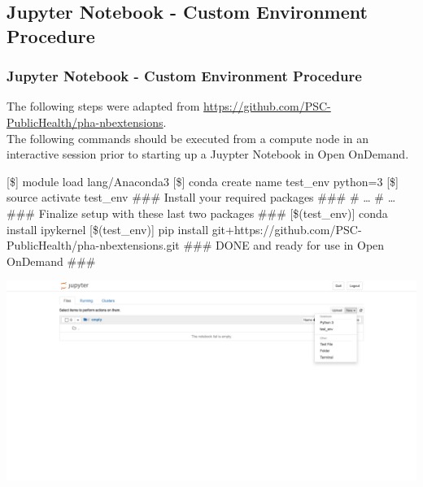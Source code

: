 \subsection[jupenv]{Jupyter Notebook - Custom Environment Procedure}
\begin{frame}[fragile]
	\frametitle{Jupyter Notebook - Custom Environment Procedure}
	\begin{block}{}
	The following steps were adapted from \url{https://github.com/PSC-PublicHealth/pha-nbextensions}.~\\The following commands should be executed from a compute node in an interactive session prior to starting up a Juypter Notebook in Open OnDemand.
	\end{block}
	\begin{semiverbatim}\footnotesize
	[\$] module load lang/Anaconda3
	[\$] conda create \ddash{}name test\_env python=3
	[\$] source activate test\_env
	\#\#\# Install your required packages \#\#\#
	\# \ldots 
	\# \ldots 
	\#\#\# Finalize setup with these last two packages \#\#\#
	[\$(test\_env)] conda install ipykernel
	[\$(test\_env)] pip install git+https://github.com/PSC-PublicHealth/pha-nbextensions.git
	\#\#\# DONE and ready for use in Open OnDemand \#\#\#
 	\end{semiverbatim}
	\vspace{-1.5em}
	\begin{center}
  \includegraphics[scale=0.08]{juypter.png}
	\end{center}
	
\end{frame}

